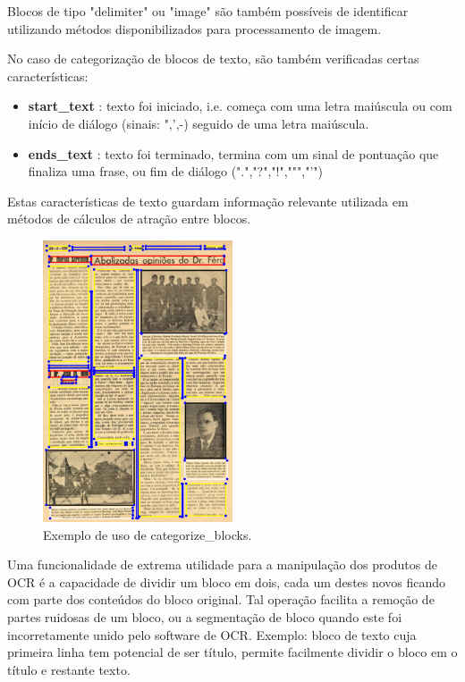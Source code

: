 Blocos de tipo "delimiter" ou "image" são também possíveis de identificar utilizando métodos disponibilizados para processamento de imagem.

No caso de categorização de blocos de texto, são também verificadas certas características:
\begin{itemize}\setlength\itemsep{-0.3em}
	\item \textbf{start\_text} : texto foi iniciado, i.e. começa com uma letra maiúscula ou com início de diálogo (sinais: ",',-) seguido de uma letra maiúscula.
	\item \textbf{ends\_text} : texto foi terminado, termina com um sinal de pontuação que finaliza uma frase, ou fim de diálogo (".","?","!",""","'")
\end{itemize}

Estas características de texto guardam informação relevante utilizada em métodos de cálculos de atração entre blocos.



\begin{figure}[H]
	\centering
	\includegraphics[width=0.5\textwidth]{images/ilustracoes/categorize_blocks.png}
	\caption{Exemplo de uso de categorize\_blocks.}
	\label{fig:categorize_blocks}
\end{figure}



\label{contribution_divide_blocks}

Uma funcionalidade de extrema utilidade para a manipulação dos produtos de OCR é a capacidade de dividir um bloco em dois, cada um destes novos ficando com parte dos conteúdos do bloco original. Tal operação facilita a remoção de partes ruidosas de um bloco, ou a segmentação de bloco quando este foi incorretamente unido pelo software de OCR. Exemplo: bloco de texto cuja primeira linha tem potencial de ser título, permite facilmente dividir o bloco em o título e restante texto.


